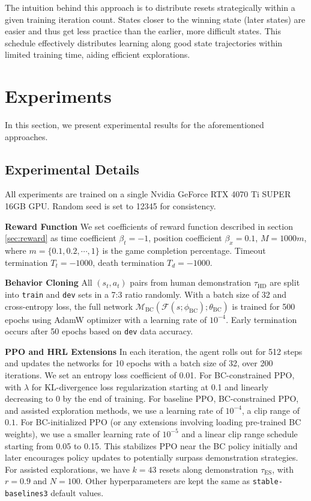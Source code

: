 \documentclass{article}
\begin{document}
The intuition behind this approach is to distribute resets strategically 
within a given training iteration count. States closer to the winning 
state (later states) are easier and thus get less practice than the 
earlier, more difficult states. This schedule effectively distributes 
learning along good state trajectories within limited training time, 
aiding efficient explorations.




\section{Experiments}
In this section, we present experimental results for the aforementioned 
approaches. 

\subsection{Experimental Details}
All experiments are trained on a single Nvidia GeForce RTX 4070 Ti 
SUPER 16GB GPU. Random seed is set to 12345 for consistency.

\textbf{Reward Function} We set coefficients of reward function described
in section \ref{sec:reward} as time coefficient $\beta_t = -1$, 
position coefficient $\beta_x = 0.1$, 
$M=1000m$, where $m=\{0.1, 0.2, \cdots, 1\}$ is the game completion percentage.
Timeout termination $T_t = -1000$, death termination $T_d = -1000$.

\textbf{Behavior Cloning} All $(s_t, a_t)$ 
pairs from human demonstration $\tau_{\text{HD}}$ are split into 
\texttt{train} and \texttt{dev} sets in a 7:3 ratio randomly. 
With a batch size of 32 and cross-entropy loss, the full network 
$\mathcal{M}_{\text{BC}}(\mathcal{F}(s; \phi_{\text{BC}});\theta_{\text{BC}})$ is trained for 500 epochs using 
AdamW optimizer with a learning rate of $10^{-4}$. Early termination 
occurs after 50 epochs based on \texttt{dev} data accuracy.

\textbf{PPO and HRL Extensions} In each iteration, the agent rolls out for 
512 steps and updates the networks for 10 epochs with a batch size of 32, 
over 200 iterations. We set an entropy loss coefficient of 0.01. For 
BC-constrained PPO, with $\lambda$ for KL-divergence loss regularization 
starting at 0.1 and linearly decreasing to 0 by the end of training.
For baseline PPO, BC-constrained PPO, and assisted exploration methods, we use 
a learning rate of $10^{-4}$, a clip range of $0.1$. For BC-initialized 
PPO (or any extensions involving loading pre-trained BC weights), 
we use a smaller learning rate of $10^{-5}$ and a linear clip 
range schedule starting from 0.05 to 0.15. This stabilizes PPO near the BC 
policy initially and later encourages policy updates to potentially surpass 
demonstration strategies. For assisted explorations, we have $k=43$ resets 
along demonstration $\tau_{\text{ES}}$, with $r=0.9$ and $N=100$.
Other hyperparameters are kept the same as \texttt{stable-baselines3} default values.
\end{document}
